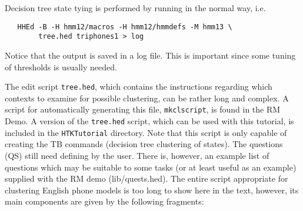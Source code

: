 Decision tree state tying is performed by running  
in the normal way, i.e.
\begin{verbatim}
   HHEd -B -H hmm12/macros -H hmm12/hmmdefs -M hmm13 \
        tree.hed triphones1 > log
\end{verbatim}
Notice that the output is saved in a log file.  This is important since
some tuning of thresholds is usually needed.

The edit script \texttt{tree.hed}, which contains the instructions regarding
which contexts to examine for possible clustering, can be rather long and
complex. A script for automatically generating this file, \texttt{mkclscript},
is found in the RM Demo. A version of the \texttt{tree.hed} script, which can
be used with this tutorial, is included in the \texttt{HTKTutorial} directory.
Note that this script is only capable of creating the TB commands (decision 
tree clustering of states).  The questions (QS) still need defining by
the user.  There is, however, an example list of questions which may be 
suitable to some tasks (or at least useful as an example) supplied with the 
RM demo (lib/quests.hed).  The entire script appropriate for clustering 
English phone models is too long to show here in the text, however, its main 
components are given by the following fragments:

